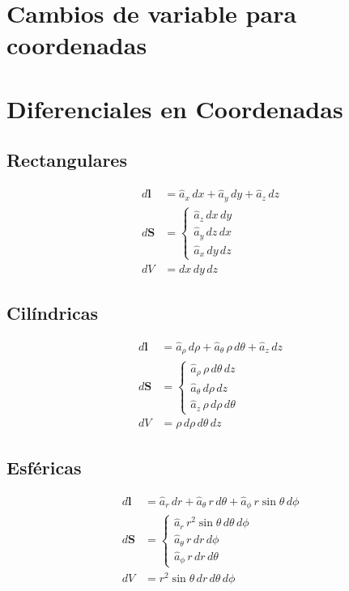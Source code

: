 \documentclass[11pt]{article}
\begin{document}
\begin{multicols}{2}

\section{Cambios de variable para coordenadas}

\section{Diferenciales en Coordenadas}

\subsection{Rectangulares}
\begin{align}
    d\mathbf{l} &= \hat{a}_x \, dx + \hat{a}_y \, dy + \hat{a}_z \, dz \\[6pt]
    d\mathbf{S} &= \begin{cases}
        \hat{a}_z \, dx \, dy \\
        \hat{a}_y \, dz \, dx \\
        \hat{a}_x \, dy \, dz
    \end{cases} \\[6pt]
    dV &= dx \, dy \, dz
\end{align}

\subsection{Cilíndricas}
\begin{align}
    d\mathbf{l} &= \hat{a}_\rho \, d\rho + \hat{a}_\theta \, \rho \, d\theta + \hat{a}_z \, dz \\[6pt]
    d\mathbf{S} &= \begin{cases}
        \hat{a}_\rho \, \rho \, d\theta \, dz \\
        \hat{a}_\theta \, d\rho \, dz \\
        \hat{a}_z \, \rho \, d\rho \, d\theta
    \end{cases} \\[6pt]
    dV &= \rho \, d\rho \, d\theta \, dz
\end{align}

\subsection{Esféricas}
\begin{align}
    d\mathbf{l} &= \hat{a}_r \, dr + \hat{a}_\theta \, r \, d\theta + \hat{a}_\phi \, r \sin \theta \, d\phi \\[6pt]
    d\mathbf{S} &= \begin{cases}
        \hat{a}_r \, r^2 \sin\theta \, d\theta \, d\phi \\
        \hat{a}_\theta \, r \, dr \, d\phi \\
        \hat{a}_\phi \, r \, dr \, d\theta
    \end{cases} \\[6pt]
    dV &= r^2 \sin\theta \, dr \, d\theta \, d\phi
\end{align}
\columnbreak


\end{multicols}
\end{document}
